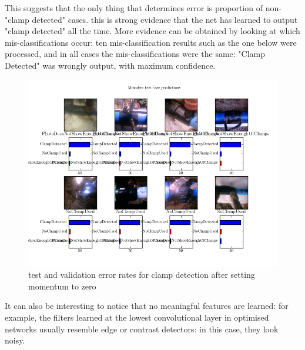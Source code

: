 \documentclass[a4paper,11pt]{article}
\begin{document}
This suggests that the only thing that determines error is proportion of non-"clamp detected" cases. this is strong evidence that the net has learned to output "clamp detected" all the time. More evidence can be obtained by looking at which mis-classifications occur: ten mis-classification results such as the one below were processed, and in all cases the mis-classifications were the same: "Clamp Detected" was wrongly output, with maximum confidence.\\

\begin{figure}[h!]
	\centering
	\includegraphics[scale=0.5]{images/preds9.png}
	\caption{test and validation error rates for clamp detection after setting momentum to zero}
\end{figure}

It can also be interesting to notice that no meaningful features are learned: for example, the filters learned at the lowest convolutional layer in optimised networks usually resemble edge or contrast detectors: in this case, they look noisy. 
\end{document}
